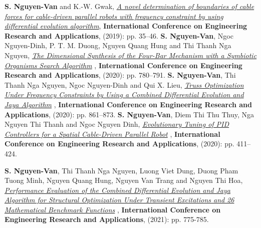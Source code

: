\documentclass{simplecv}
\begin{document}


\cvitem
{\textbf{S. Nguyen-Van} and K.-W. Gwak,
\href{https://link.springer.com/chapter/10.1007/978-3-030-37497-6_4}{ \textit{A novel determination of boundaries of cable forces for cable-driven parallel robots with frequency constraint by using differential evolution algorithm}}, \textbf{International Conference on Engineering Research and Applications}, (2019): pp. 35–46.}
\cvitem
{\textbf{S. Nguyen-Van}, Ngoc Nguyen-Dinh, P. T. M. Duong, Nguyen Quang Hung and Thi Thanh Nga Nguyen, 
\href{https://doi.org/10.1007/978-3-030-64719-3_85}{\textit{The Dimensional Synthesis of the Four-Bar Mechanism with a Symbiotic Organisms Search Algorithm}}
, \textbf{International Conference on Engineering Research and Applications}, (2020): pp. 780–791.}
\cvitem
{\textbf{S. Nguyen-Van}, Thi Thanh Nga Nguyen, Ngoc Nguyen-Dinh and Qui X. Lieu, 
\href{https://link.springer.com/chapter/10.1007/978-3-030-64719-3_95}{	\textit{Truss Optimization Under Frequency Constraints by Using a Combined Differential Evolution and Jaya Algorithm}}
, \textbf{International Conference on Engineering Research and Applications}, (2020): pp. 861–873.}
\cvitem
{\textbf{S. Nguyen-Van}, Diem Thi Thu Thuy, Nga Nguyen Thi Thanh and Ngoc Nguyen Dinh, 
\href{https://link.springer.com/chapter/10.1007/978-3-030-64719-3_46}{\textit{Evolutionary Tuning of PID Controllers for a Spatial Cable-Driven Parallel Robot}}
, \textbf{International Conference on Engineering Research and Applications}, (2020): pp. 411–424.}

\cvitem
{\textbf{S. Nguyen-Van}, Thi Thanh Nga Nguyen, Luong Viet Dung, Duong Pham Tuong Minh, Nguyen Quang Hung, Nguyen Van Trang and Nguyen Thi Hoa, 
	\href{https://doi.org/10.1007/978-3-030-92574-1_79}{\textit{Performance Evaluation of the Combined Differential Evolution and Jaya Algorithm for Structural Optimization Under Transient Excitations and 26 Mathematical Benchmark Functions}}
	, \textbf{International Conference on Engineering Research and Applications}, (2021): pp. 775-785.}
\end{document}
